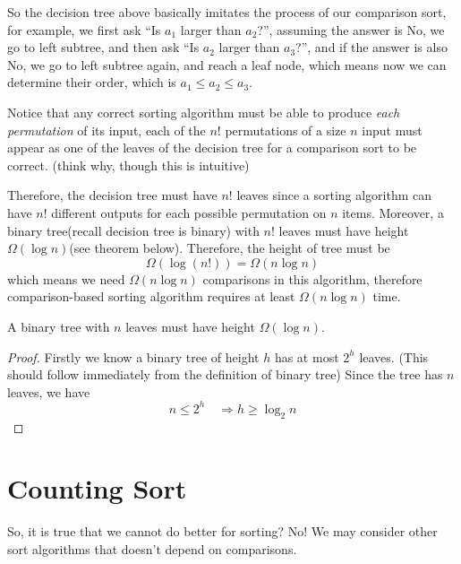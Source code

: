 \begin{spacing}{1.3}
    So the decision tree above basically imitates the process of our comparison sort,
    for example, we first ask ``Is $a_1$ larger than $a_2$?'', assuming the answer is 
    No, we go to left subtree, and then ask ``Is $a_2$ larger than $a_3$?'', and if 
    the answer is also No, we go to left subtree again, and reach a leaf node, 
    which means now we can determine their order, which is $a_1\le a_2\le a_3$.

    Notice that any correct sorting algorithm must be able to produce {\it each 
    permutation} of its input, each of the $n!$ permutations of a size $n$ input 
    must appear as one of the leaves of the decision tree for a comparison sort to be correct.
    (think why, though this is intuitive)

    Therefore, the decision tree must have $n!$ leaves since a sorting algorithm 
    can have $n!$ different outputs for each possible permutation on $n$ items.
    Moreover, a binary tree(recall decision tree is binary) with $n!$ leaves must 
    have height $\Omega(\log n)$(see theorem below). Therefore, the height of 
    tree must be 
    $$\Omega (\log (n!))=\Omega(n\log n)$$
    which means we need $\Omega(n\log n)$ comparisons in this algorithm, 
    therefore comparison-based sorting algorithm requires at least $\Omega(n\log n)$ time.

    \begin{theorem}
        A binary tree with $n$ leaves must have height $\Omega (\log n)$.
        \begin{proof}
            Firstly we know a binary tree of height $h$ has at most $2^h$ leaves.
            (This should follow immediately from the definition of binary tree)
            Since the tree has $n$ leaves, we have 
            $$n\le 2^h\quad \Rightarrow h\ge \log_2 n$$
        \end{proof}
    \end{theorem}


    
    \newpage
    \section{Counting Sort}
    So, it is true that we cannot do better for sorting? No! 
    We may consider other sort algorithms that doesn't depend on comparisons.


\end{spacing}
